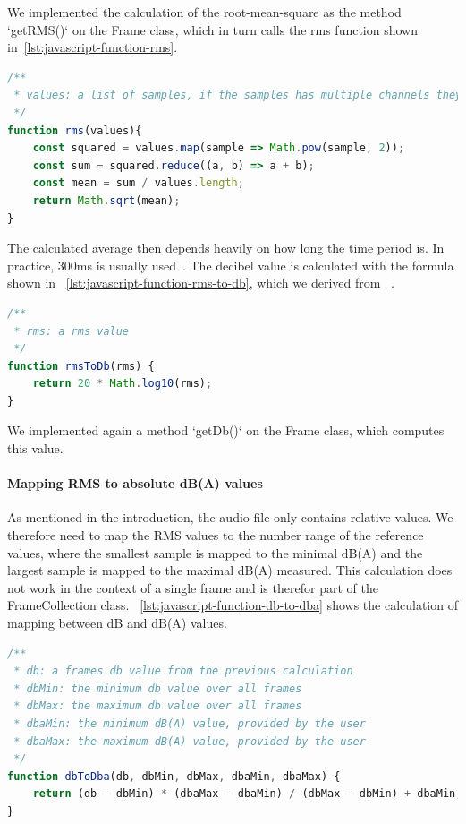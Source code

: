 We implemented the calculation of the root-mean-square as the method `getRMS()` on the Frame class,
which in turn calls the rms function shown in~\ref{lst:javascript-function-rms}.

\begin{lstlisting}[caption={JavaScript RMS function},label={lst:javascript-function-rms},language=JavaScript]
/**
 * values: a list of samples, if the samples has multiple channels they need to be averaged beforehand
 */
function rms(values){
    const squared = values.map(sample => Math.pow(sample, 2));
    const sum = squared.reduce((a, b) => a + b);
    const mean = sum / values.length;
    return Math.sqrt(mean);
}
\end{lstlisting}

The calculated average then depends heavily on how long the time period is.
In practice, 300ms is usually used~\cite{timespan_for_audio_rms_calculate}.
The decibel value is calculated with the formula shown in ~\ref{lst:javascript-function-rms-to-db}, which we derived from ~\cite{decibel_wikipedia}.

\begin{lstlisting}[caption={JavaScript RMS to DB function},label={lst:javascript-function-rms-to-db},language=JavaScript]
/**
 * rms: a rms value
 */
function rmsToDb(rms) {
    return 20 * Math.log10(rms);
}
\end{lstlisting}

We implemented again a method `getDb()` on the Frame class, which computes this value.

\paragraph{Mapping RMS to absolute dB(A) values}
As mentioned in the introduction, the audio file only contains relative values.
We therefore need to map the RMS values to the number range of the reference values,
where the smallest sample is mapped to the minimal dB(A) and the largest sample is mapped to the maximal dB(A) measured.
This calculation does not work in the context of a single frame and is therefor part of the FrameCollection class. ~\ref{lst:javascript-function-db-to-dba} shows the calculation of mapping between dB and dB(A) values. 

\begin{lstlisting}[caption={JavaScript DB to DBA function},label={lst:javascript-function-db-to-dba},language=JavaScript]
/**
 * db: a frames db value from the previous calculation
 * dbMin: the minimum db value over all frames
 * dbMax: the maximum db value over all frames
 * dbaMin: the minimum dB(A) value, provided by the user
 * dbaMax: the maximum dB(A) value, provided by the user
 */
function dbToDba(db, dbMin, dbMax, dbaMin, dbaMax) {
    return (db - dbMin) * (dbaMax - dbaMin) / (dbMax - dbMin) + dbaMin;
}
\end{lstlisting}

